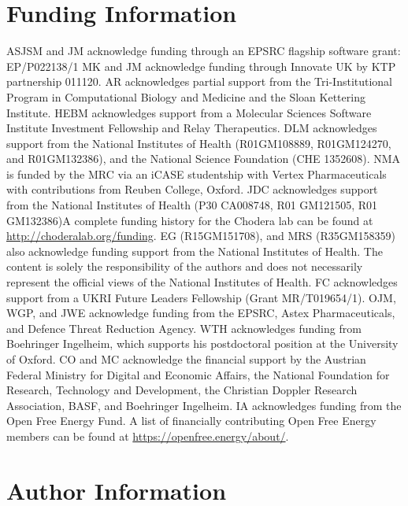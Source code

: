 \documentclass[9pt,bestpractices]{livecoms}
\begin{document}
\section*{Funding Information}
ASJSM and JM acknowledge funding through an EPSRC flagship software grant: EP/P022138/1
MK and JM acknowledge funding through Innovate UK by KTP partnership 011120.
AR acknowledges partial support from the Tri-Institutional Program in Computational Biology and Medicine and the Sloan Kettering Institute.
HEBM acknowledges support from a Molecular Sciences Software Institute Investment Fellowship and Relay Therapeutics.
DLM acknowledges support from the National Institutes of Health (R01GM108889, R01GM124270, and R01GM132386), and the National Science Foundation (CHE 1352608). NMA is funded by the MRC via an iCASE studentship with Vertex Pharmaceuticals with contributions from Reuben College, Oxford. 
JDC acknowledges support from the National Institutes of Health (P30 CA008748, R01 GM121505, R01 GM132386)A complete funding history for the Chodera lab can be found at \url{http://choderalab.org/funding}.
EG (R15GM151708), and MRS (R35GM158359) also acknowledge funding support from the National Institutes of Health.
The content is solely the responsibility of the authors and does not necessarily represent the official views of the National Institutes of Health.
FC acknowledges support from a UKRI Future Leaders Fellowship (Grant MR/T019654/1).
OJM, WGP, and JWE acknowledge funding from the EPSRC, Astex Pharmaceuticals, and Defence Threat Reduction Agency.
WTH acknowledges funding from Boehringer Ingelheim, which supports his postdoctoral position at the University of Oxford.
CO and MC acknowledge the financial support by the Austrian Federal Ministry for Digital and Economic Affairs, the National Foundation for Research, Technology and Development, the Christian Doppler Research Association, BASF, and Boehringer Ingelheim.
IA acknowledges funding from the Open Free Energy Fund. A list of financially contributing Open Free Energy members can be found at \url{https://openfree.energy/about/}.


\section*{Author Information}
\makeorcid



\end{document}
